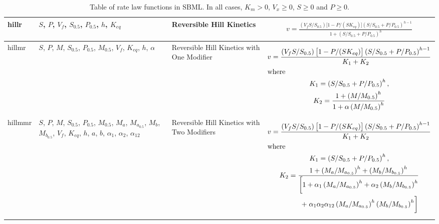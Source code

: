 \documentclass[10pt]{cekarticle}
\newcommand{\changed}[1]{\textcolor{BrickRed}{#1}}
\newenvironment{blockChanged}{\color{BrickRed}}{}
\begin{document}
\begin{table}[ht]
\begin{tabular}{|m{0.5in}|>{\raggedright}m{0.78in}|>{\raggedright}m{1.2in}|m{3.3in}|}
hillr & $S$, $P$, $V_f$, $S_{0.5}$, $P_{0.5}$, $h$, $K_{eq}$ & Reversible
Hill Kinetics &
\begin{gather*}
v = \frac{\left(V_f S / S_{0.5}
\right) \bigl[ 1 - P / ( S K_{eq} ) \bigr]
\left(S / S_{0.5} + P / P_{0.5}\right)^{h-1}}{1 +
\left(S / S_{0.5} + P / P_{0.5}\right)^h}
\end{gather*}
\\ \hline

hillmr & \changed{$S$, $P$, $M$, $S_{0.5}$, $P_{0.5}$, $M_{0.5}$, $V_f$, $K_{eq}$, $h$, $\alpha$} & Reversible Hill
Kinetics with One Modifier &
\begin{gather*}
v = \frac{\left(V_f
S / S_{0.5} \right) \bigl[1 - P / ( S K_{eq} ) \bigr]
\left(S / S_{0.5} + P / P_{0.5}\right)^{h-1}} {K_1 +
K_2} \\
\intertext{where}
K_1 = \left(S / S_{0.5} +
P / P_{0.5}\right)^h, \\
K_2 = \frac{1 + \left(M / M_{0.5}\right)^h}{1
  + \alpha \left(M / M_{0.5}\right)^h}
\end{gather*}
\\ \hline

hillmmr & \changed{$S$, $P$, $M$, $S_{0.5}$, $P_{0.5}$, $M_{0.5}$, $M_a$, $M_{a_{0.5}}$, 
$M_b$, $M_{b_{0.5}}$, $V_f$, $K_{eq}$, $h$, $a$, $b$, $\alpha_1$, $\alpha_2$, $\alpha_{12}$} &
Reversible Hill Kinetics with Two Modifiers &
\begin{blockChanged}
\begin{gather*}
v = \frac{\left(V_f
S / S_{0.5} \right) \bigl[ 1 - P / (S K_{eq} ) \bigr]
\left(S / S_{0.5} + P / P_{0.5}\right)^{h-1}} {K_1 +
K_2} \\
\intertext{where}
K_1 = \left(S / S_{0.5} + P / P_{0.5}\right)^h ,\\
K_2 = \frac{1 + \left(M_a / M_{a_{0.5}}\right)^h + \left( M_b / M_{b_{0.5}}
\right)^h }{\begin{split}
\biggl[ 1 + \alpha_1 \left(M_a / M_{a_{0.5}}\right)^h +
\alpha_2 \left(M_b / M_{b_{0.5}}\right)^h \\
+\; \alpha_1 \alpha_2
\alpha_{12} \left( M_a / M_{a_{0.5}} \right)^h \left(
  M_b / M_{b_{0.5}} \right)^h \biggr] \end{split} }
\end{gather*}
\end{blockChanged}
\\ \hline

\end{tabular}
\caption{Table of rate law functions in SBML.  In all cases, $K_m > 0$, $V_x \geq 0$, $S
  \geq 0$ and $P \geq 0$.}
\label{tab:ratelaws}
\end{table}
\end{document}
